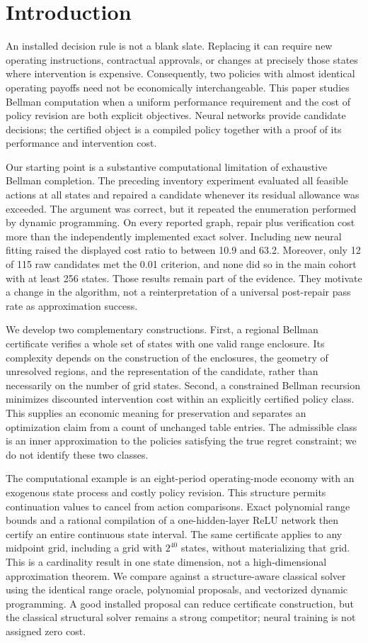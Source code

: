 \section{Introduction}
An installed decision rule is not a blank slate. Replacing it can require new operating instructions, contractual approvals, or changes at precisely those states where intervention is expensive. Consequently, two policies with almost identical operating payoffs need not be economically interchangeable. This paper studies Bellman computation when a uniform performance requirement and the cost of policy revision are both explicit objectives. Neural networks provide candidate decisions; the certified object is a compiled policy together with a proof of its performance and intervention cost.

Our starting point is a substantive computational limitation of exhaustive Bellman completion. The preceding inventory experiment evaluated all feasible actions at all states and repaired a candidate whenever its residual allowance was exceeded. The argument was correct, but it repeated the enumeration performed by dynamic programming. On every reported graph, repair plus verification cost more than the independently implemented exact solver. Including new neural fitting raised the displayed cost ratio to between 10.9 and 63.2. Moreover, only 12 of 115 raw candidates met the 0.01 criterion, and none did so in the main cohort with at least 256 states. Those results remain part of the evidence. They motivate a change in the algorithm, not a reinterpretation of a universal post-repair pass rate as approximation success.

We develop two complementary constructions. First, a regional Bellman certificate verifies a whole set of states with one valid range enclosure. Its complexity depends on the construction of the enclosures, the geometry of unresolved regions, and the representation of the candidate, rather than necessarily on the number of grid states. Second, a constrained Bellman recursion minimizes discounted intervention cost within an explicitly certified policy class. This supplies an economic meaning for preservation and separates an optimization claim from a count of unchanged table entries. The admissible class is an inner approximation to the policies satisfying the true regret constraint; we do not identify these two classes.

The computational example is an eight-period operating-mode economy with an exogenous state process and costly policy revision. This structure permits continuation values to cancel from action comparisons. Exact polynomial range bounds and a rational compilation of a one-hidden-layer ReLU network then certify an entire continuous state interval. The same certificate applies to any midpoint grid, including a grid with $2^{40}$ states, without materializing that grid. This is a cardinality result in one state dimension, not a high-dimensional approximation theorem. We compare against a structure-aware classical solver using the identical range oracle, polynomial proposals, and vectorized dynamic programming. A good installed proposal can reduce certificate construction, but the classical structural solver remains a strong competitor; neural training is not assigned zero cost.

